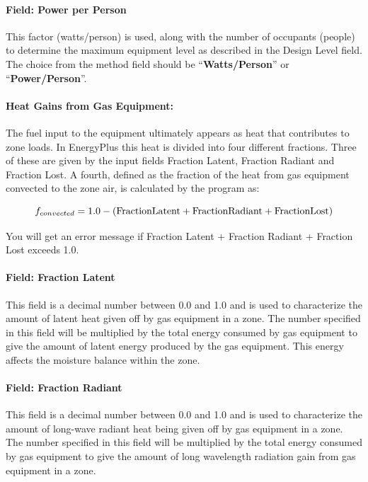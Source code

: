\paragraph{Field: Power per Person}\label{field-power-per-person}

This factor (watts/person) is used, along with the number of occupants (people) to determine the maximum equipment level as described in the Design Level field. The choice from the method field should be ``\textbf{Watts/Person}'' or ``\textbf{Power/Person}''.

\paragraph{Heat Gains from Gas Equipment:}\label{heat-gains-from-gas-equipment}

The fuel input to the equipment ultimately appears as heat that contributes to zone loads. In EnergyPlus this heat is divided into four different fractions. Three of these are given by the input fields Fraction Latent, Fraction Radiant and Fraction Lost. A fourth, defined as the fraction of the heat from gas equipment convected to the zone air, is calculated by the program as:

\begin{equation}
  f_{convected} = 1.0 - (\rm{Fraction Latent} + \rm{Fraction Radiant} + \rm{Fraction Lost})
\end{equation}

You will get an error message if Fraction Latent + Fraction Radiant + Fraction Lost exceeds 1.0.

\paragraph{Field: Fraction Latent}\label{field-fraction-latent-1}

This field is a decimal number between 0.0 and 1.0 and is used to characterize the amount of latent heat given off by gas equipment in a zone. The number specified in this field will be multiplied by the total energy consumed by gas equipment to give the amount of latent energy produced by the gas equipment. This energy affects the moisture balance within the zone.

\paragraph{Field: Fraction Radiant}\label{field-fraction-radiant-3}

This field is a decimal number between 0.0 and 1.0 and is used to characterize the amount of long-wave radiant heat being given off by gas equipment in a zone. The number specified in this field will be multiplied by the total energy consumed by gas equipment to give the amount of long wavelength radiation gain from gas equipment in a zone.

